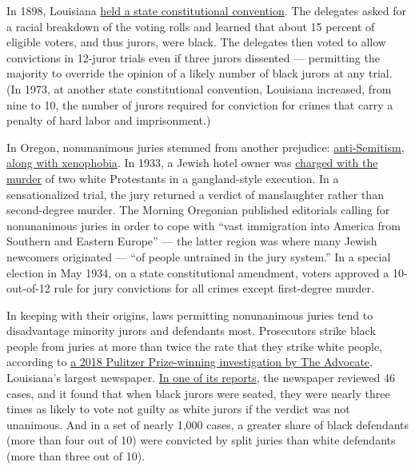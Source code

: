 In 1898, Louisiana
\href{https://babel.hathitrust.org/cgi/pt?id=njp.32101065310607\&view=1up\&seq=7}{held
a state constitutional convention}. The delegates asked for a racial
breakdown of the voting rolls and learned that about 15 percent of
eligible voters, and thus jurors, were black. The delegates then voted
to allow convictions in 12-juror trials even if three jurors dissented
--- permitting the majority to override the opinion of a likely number
of black jurors at any trial. (In 1973, at another state constitutional
convention, Louisiana increased, from nine to 10, the number of jurors
required for conviction for crimes that carry a penalty of hard labor
and imprisonment.)

In Oregon, nonunanimous juries stemmed from another prejudice:
\href{https://scholarsbank.uoregon.edu/xmlui/bitstream/handle/1794/22247/Kaplan.pdf?sequence=1\&isAllowed=y}{anti-Semitism,
along with xenophobia}. In 1933, a Jewish hotel owner was
\href{https://www.oregonlive.com/pacific-northwest-news/2017/09/inside_the_1933_murder_trial_t.html}{charged
with the murder} of two white Protestants in a gangland-style execution.
In a sensationalized trial, the jury returned a verdict of manslaughter
rather than second-degree murder. The Morning Oregonian published
editorials calling for nonunanimous juries in order to cope with ``vast
immigration into America from Southern and Eastern Europe'' --- the
latter region was where many Jewish newcomers originated --- ``of people
untrained in the jury system.'' In a special election in May 1934, on a
state constitutional amendment, voters approved a 10-out-of-12 rule for
jury convictions for all crimes except first-degree murder.

In keeping with their origins, laws permitting nonunanimous juries tend
to disadvantage minority jurors and defendants most. Prosecutors strike
black people from juries at more than twice the rate that they strike
white people, according to
\href{https://www.nola.com/news/courts/article_64f67fc8-9ab4-56b6-bb45-598b6795cffa.html}{a
2018 Pulitzer Prize-winning investigation by The Advocate}, Louisiana's
largest newspaper.
\href{https://www.nola.com/news/courts/article_8e284de1-9c5c-5d77-bcc5-6e22a3053aa0.html}{In
one of its reports}, the newspaper reviewed 46 cases, and it found that
when black jurors were seated, they were nearly three times as likely to
vote not guilty as white jurors if the verdict was not unanimous. And in
a set of nearly 1,000 cases, a greater share of black defendants (more
than four out of 10) were convicted by split juries than white
defendants (more than three out of 10).

